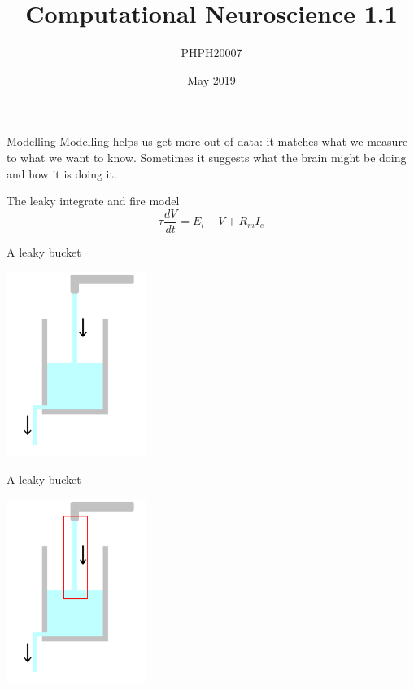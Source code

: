 \documentclass{beamer}
\title[Computational Neuroscience 1.1]{Computational Neuroscience 1.1}
\author{PHPH20007}
\institute{\texttt{github.com/conorhoughton/PHPH20007}}
\date{May 2019}
\begin{document}
\maketitle

\begin{frame}{Modelling}
  Modelling helps us get more out of data: it matches what we measure to what we want to know. Sometimes it suggests what the brain might be doing and how it is doing it.
  \end{frame}


\begin{frame}{The leaky integrate and fire model}
\color{black}
\color{reddish}
$$
\tau \frac{dV}{dt}=E_l-V+R_mI_e
$$
\color{black}
\end{frame}

\begin{frame}{A leaky bucket}

  \begin{center}
    \includegraphics[height=6cm]{glass.png}
  \end{center}
  
  
\end{frame}



\begin{frame}{A leaky bucket}

  \begin{center}
    \includegraphics[height=6cm]{glass_in.png}
  \end{center}
  
  
\end{frame}
\end{document}
